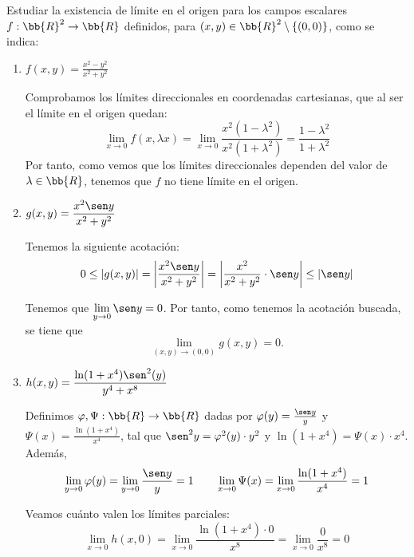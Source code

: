 \begin{ejercicio}
    Estudiar la existencia de límite en el origen para los campos escalares $f : \bb{R}^2 \to \bb{R}$ definidos, para $(x, y) \in \bb{R}^2 \setminus \{(0, 0)\}$, como se indica:
    \begin{enumerate}
        \item $\displaystyle f(x,y)=\frac{x^2-y^2}{x^2+y^2}$

        Comprobamos los límites direccionales en coordenadas cartesianas, que al ser el límite en el origen quedan:
        \begin{equation*}
            \lim_{x\to 0}f(x,\lambda x)
            = \lim_{x\to 0} \frac{x^2(1-\lambda^2)}{x^2(1+\lambda^2)}
            =\frac{1-\lambda^2}{1+\lambda^2}
        \end{equation*}
        Por tanto, como vemos que los límites direccionales dependen del valor de $\lambda \in \bb{R}$, tenemos que $f$ no tiene límite en el origen.

        \item $\displaystyle g(x,y)=\frac{x^2\sen y}{x^2+y^2}$

        Tenemos la siguiente acotación:
        \begin{equation*}
            0\leq |g(x,y)|
            =\left|
                \frac{x^2\sen y}{x^2+y^2}
            \right|
            =\left|
                \frac{x^2}{x^2+y^2}\cdot \sen y
            \right|
            \leq |\sen y|
        \end{equation*}

        Tenemos que $\lim\limits_{y\to 0}\sen y=0$. Por tanto, como tenemos la acotación buscada, se tiene que $$\lim\limits_{(x,y)\to(0,0)}g(x,y)=0.$$

        \item $\displaystyle h(x,y)=\frac{\ln(1+x^4)\sen^2(y)}{y^4+x^8}$

        Definimos $\varphi,\Psi:\bb{R}\to \bb{R}$ dadas por $\varphi(y)=\frac{\sen y}{y}$ y $\Psi(x)=\frac{\ln(1+x^4)}{x^4}$, tal que $\sen^2 y =\varphi^2(y)\cdot y^2$ y $\ln(1+x^4) =\Psi(x)\cdot x^4$. Además,
        \begin{equation*}
            \lim_{y\to 0}\varphi(y)
            = \lim_{y\to 0}\frac{\sen y}{y}=1
            \qquad
            \lim_{x\to 0}\Psi(x)
            = \lim_{x\to 0}\frac{\ln (1+x^4)}{x^4}=1
        \end{equation*}

        Veamos cuánto valen los límites parciales:
        \begin{equation*}
            \lim_{x\to 0}h(x,0)
            = \lim_{x\to 0} \frac{\ln(1+x^4)\cdot 0}{x^8}
            = \lim_{x\to 0} \frac{0}{x^8} = 0
        \end{equation*}


\end{enumerate}
\end{ejercicio}
